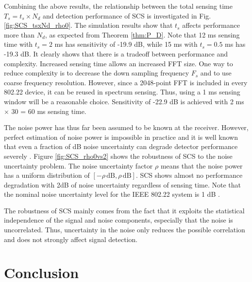 \documentclass[draftclsnofoot,onecolumn,12pt]{IEEEtran}
\begin{document}
Combining the above results, the relationship between the total sensing time $T_s = t_s \times N_d$ and
detection performance of SCS is investigated in Fig. \ref{fig:SCS_tsxNd_rho0}.
The simulation results show that $t_s$ affects performance more than $N_d$,
as expected from Theorem \ref{thm:P_D}.
Note that 12 ms sensing time with $t_s = 2$ ms has sensitivity of -19.9 dB, while 15 ms with $t_s = 0.5$ ms has -19.3 dB.
It clearly shows that there is a tradeoff between performance and complexity.
Increased sensing time allows an increased FFT size.
One way to reduce complexity is to decrease the down sampling frequency
$F_s$ and to use coarse frequency resolution. However, since a 2048-point FFT is included in every 802.22 device,
it can be reused in spectrum sensing. Thus, using a 1 ms sensing window will be a reasonable choice.
Sensitivity of -22.9 dB is
achieved with 2 ms $\times$ 30 = 60 ms sensing time.






The noise power has thus far been assumed to be known at the receiver. However, perfect
estimation of noise power is impossible in practice and it is well known that even
a fraction of dB noise uncertainty can degrade detector performance severely \cite{TanSah08}.
Figure \ref{fig:SCS_rho0vs2} shows the robustness of SCS to the noise uncertainty problem.
The noise uncertainty factor $\rho$ means that the noise
power has a uniform distribution of $[-\rho \,\mathrm{dB}, \rho \,\mathrm{dB}]$.  SCS shows almost
no performance degradation with 2dB of noise uncertainty regardless of sensing time.
Note that the nominal noise uncertainty level for the IEEE 802.22 system is 1 dB \cite{802.22_Req}.


The robustness of SCS mainly comes from the fact that it exploits the statistical independence of
the signal and noise components, especially that the noise is uncorrelated. Thus, uncertainty in the noise
only reduces the possible correlation and does not strongly affect signal detection.



\section{Conclusion}
\label{sec:conclusion}
\end{document}
